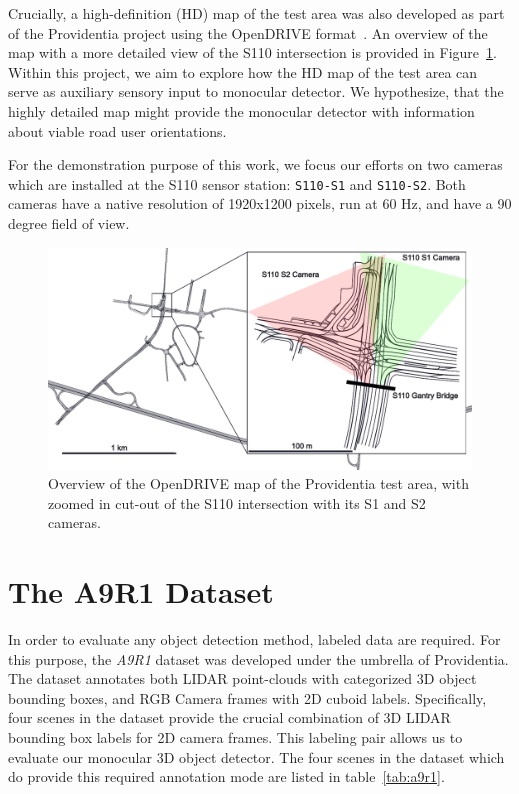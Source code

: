 Crucially, a high-definition (HD) map of the test area was also developed as part of the Providentia project using the OpenDRIVE format~\cite{dupuis2010opendrive}.
An overview of the map with a more detailed view of the S110 intersection is provided in Figure~\ref{fig:providentia-opendrive-map}.
Within this project, we aim to explore how the HD map of the test area can serve as  auxiliary sensory input to monocular detector.
We hypothesize, that the highly detailed map might provide the monocular detector with information about viable road user orientations.

For the demonstration purpose of this work, we focus our efforts on two cameras which are installed at the S110 sensor station: \texttt{S110-S1} and \texttt{S110-S2}.
Both cameras have a native resolution of 1920x1200 pixels, run at 60 Hz, and have a 90 degree field of view.  %

\begin{figure}[htb]
    \includegraphics[width=\linewidth]{figures/map}
    \caption{Overview of the OpenDRIVE map of the Providentia test area, with zoomed in cut-out of the S110 intersection with its S1 and S2 cameras.}
    \label{fig:providentia-opendrive-map}
\end{figure}


\section{The A9R1 Dataset}
\label{sec:a9dataset}

In order to evaluate any object detection method, labeled data are required.
For this purpose, the \textit{A9R1} dataset was developed under the umbrella of Providentia.
The dataset annotates both LIDAR point-clouds with categorized 3D object bounding boxes, and RGB Camera frames with 2D cuboid labels.
Specifically, four scenes in the dataset provide the crucial combination of 3D LIDAR bounding box labels for 2D camera frames.
This labeling pair allows us to evaluate our monocular 3D object detector.
The four scenes in the dataset which do provide this required annotation mode are listed in table~\ref{tab:a9r1}.

